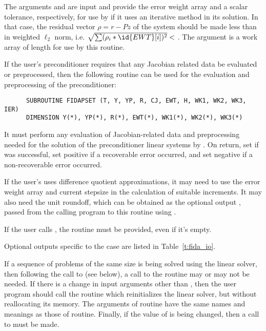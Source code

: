 \begin{Steps}
  The arguments  and  are input and provide the error weight
  array and a scalar tolerance, respectively, for use by  if it uses
  an iterative method in its solution.  In that case, the residual vector
  $\rho = r - Pz$ of the system should be made less than  in weighted
  $\ell_2$ norm, i.e. $\sqrt{\sum(\rho_i * \id{EWT}[i])^2} < $ .
  The argument  is a work array of length  for use by this
  routine.

  If the user's preconditioner requires that any Jacobian related data be evaluated
  or preprocessed, then the following routine can be used for the evaluation and 
  preprocessing of the preconditioner:
\begin{verbatim}
      SUBROUTINE FIDAPSET (T, Y, YP, R, CJ, EWT, H, WK1, WK2, WK3, IER)
      DIMENSION Y(*), YP(*), R(*), EWT(*), WK1(*), WK2(*), WK3(*) 
\end{verbatim}
  It must perform any evaluation of Jacobian-related data and preprocessing needed
  for the solution of the preconditioner linear systems by .
  On return, set  if  was successful, set 
  positive if a recoverable error occurred, and set  negative if a 
  non-recoverable error occurred.
  
  If the user's  uses difference quotient approximations, it
  may need to use the error weight array  and current stepsize 
  in the calculation of suitable increments.  It may also need the unit
  roundoff, which can be obtained as the optional output ,
  passed from the calling program to this routine using .

  {\warn} If the user calls , the routine  must
  be provided, even if it's empty.

  Optional outputs specific to the {\spbcg} case are listed in Table~\ref{t:fida_io}.
  
  If a sequence of problems of the same size is being solved using the {\spbcg}
  linear solver, then following the call to  (see below), a call to
  the  routine may or may not be needed.  If there is a change in input
  arguments other than , then the user program should call the routine
   which reinitializes the {\spbcg} linear solver, but without
  reallocating its memory. The arguments of  routine have the same
  names and meanings as those of  routine.  Finally, if the value of
   is being changed, then a call to  must be made.


\end{Steps}
